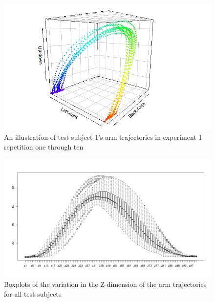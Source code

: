 \documentclass[11pt, fleqn, titlepage]{article}
\begin{document}
\begin{figure}[H]
	\centering
	\includegraphics[scale=0.6]{billeder/Rplot.png}
	\caption{An illustration of test subject 1's arm trajectories in experiment 1 repetition one through ten}
	\label{fig:rplot}
\end{figure}


\begin{figure}[H]
	\centering
	\includegraphics[width=0.7\linewidth]{billeder/boxplot_z.pdf}
	\caption{Boxplots of the variation in the Z-dimension of the arm trajectories for all test subjects}
	\label{fig:boxplotz}
\end{figure}
\end{document}
